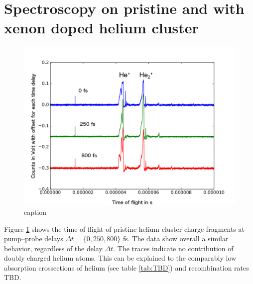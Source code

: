 \section{Spectroscopy on pristine and with xenon doped helium cluster}
\begin{figure}
	\centering
		\includegraphics[width=1.00\textwidth]{images/results/TOF-helium-cluster.png}
	\caption{caption}
	\label{fig:TOF-helium-cluster}
\end{figure}
Figure \ref{fig:TOF-helium-cluster} shows the time of flight of pristine helium cluster charge fragments at pump--probe delays $\Delta t=\{0, 250, 800\}$ fs. The data show overall a similar behavior, regardless of the delay $\Delta t$. The traces indicate no contribution of doubly charged helium atoms. This can be explained to the comparably low absorption crossections of helium (see table \ref{tab:TBD}) and recombination rates TBD.\\
